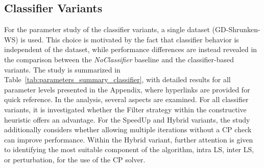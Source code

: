 \subsection{Classifier Variants}
\label{subsec_parameterStuy_speedup}
For the parameter study of the classifier variants, a single dataset (GD-Shrunken-WS) is used. This choice is motivated
by the fact that classifier behavior is independent of the dataset, while performance differences are instead revealed in
the comparison between the \textit{NoClassifier} baseline and the classifier-based variants. The study is summarized in
Table~\ref{tab:parameters_summary_classifier}, with detailed results for all parameter levels presented in the Appendix,
where hyperlinks are provided for quick reference.
In the analysis, several aspects are examined. For all classifier variants, it is investigated whether the Filter strategy
within the constructive heuristic offers an advantage. For the SpeedUp and Hybrid variants, the study additionally
considers whether allowing multiple iterations without a \gls{CP} check can improve performance. Within the Hybrid variant,
further attention is given to identifying the most suitable component of the algorithm, intra \gls{LS}, inter \gls{LS}, or
perturbation, for the use of the \gls{CP} solver.
